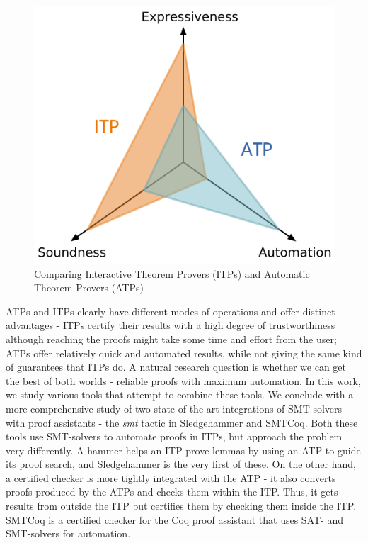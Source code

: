 \documentclass{article}
\begin{document}
	\begin{figure}[t]
		\centering
		\includegraphics[scale=0.5]{coq.pdf}
		\caption{Comparing Interactive Theorem Provers (ITPs)
		and Automatic Theorem Provers (ATPs)}
		\label{fig:graph}
	\end{figure}

	ATPs and ITPs clearly have different modes of operations
	and offer distinct advantages - ITPs certify their 
	results with a high degree of trustworthiness although 
	reaching the proofs might take some time and effort from 
	the user; ATPs offer relatively quick and automated results, 
	while not giving the same kind of guarantees that ITPs do.
	A natural research question is whether we can get the best 
	of both worlds - reliable proofs with maximum automation. 
	In this work, we study various tools that 
	attempt to combine these tools. We conclude with a 
	more comprehensive study of two state-of-the-art
	integrations of SMT-solvers with proof assistants -
	the \textit{smt} tactic in Sledgehammer and 
	SMTCoq. Both these tools use SMT-solvers to 
	automate proofs in ITPs, but approach the 
	problem very differently. A hammer helps an ITP 
	prove lemmas by using an ATP to guide its proof search, 
	and Sledgehammer is	the very first of these. 
	On the other hand, a certified checker is more 
	tightly integrated with the ATP - it also converts 
	proofs produced by the ATPs and 
	checks them within the ITP. Thus, it gets results 
	from outside the ITP but certifies them by checking them
	inside the ITP. SMTCoq is a certified checker 
	for the Coq proof assistant that uses SAT- and SMT-solvers
	for automation.
	
\end{document}
